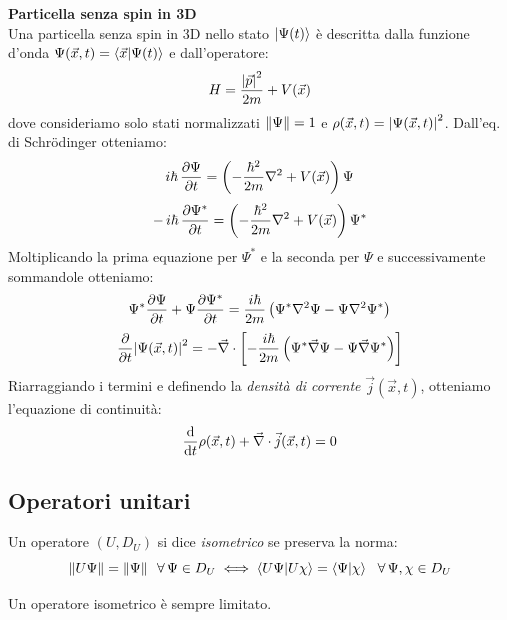 \begin{example}
    \textbf{Particella senza spin in 3D}\\
    Una particella senza spin in 3D nello stato \(\ket{\Psi(t)}\) è descritta dalla funzione d'onda \(\Psi(\vec{x},t)=\braket{\vec{x}}{\Psi(t)}\) e dall'operatore:
    \[
        H= \frac{\abs{\vec{p}}^2}{2m}+ V(\vec{x})
    \]
    dove consideriamo solo stati normalizzati \(\norm{\Psi}= 1\) e \(\rho(\vec{x},t)= \abs{\Psi(\vec{x},t)}^2\).
    Dall'eq. di Schrödinger otteniamo:
    \[
        i\hbar\,\pdv{\Psi}{t}
        = \left( -\frac{\hbar^2}{2m}\nabla^2 + V(\vec{x}) \right)\Psi
    \]
    \[
        -\,i\hbar\,\pdv{\Psi^*}{t}
        = \left( -\frac{\hbar^2}{2m}\nabla^2 + V(\vec{x}) \right)\Psi^*
    \]
    Moltiplicando la prima equazione per \(\Psi^*\) e la seconda per \(\Psi\) e successivamente sommandole otteniamo:
    \[
        \Psi^* \pdv{\Psi}{t} + \Psi \pdv{\Psi^*}{t}
        = \frac{i\hbar}{2m}\left( \Psi^* \nabla^2 \Psi - \Psi \nabla^2 \Psi^* \right)
    \]
    \[
        \pdv{t} \abs{\Psi(\vec{x},t)}^2
        = - \vec{\nabla} \cdot \left[ -\frac{i\hbar}{2m}\left( \Psi^* \vec{\nabla} \Psi - \Psi \vec{\nabla} \Psi^* \right) \right]
    \]
    Riarraggiando i termini e definendo la \textit{densità di corrente} \(\vec{j}(\vec{x},t)\), otteniamo l'equazione di continuità:
    \begin{equation}
        \dv{t}\rho(\vec{x},t) + \vec{\nabla}\cdot  \vec{j}(\vec{x},t)=0
    \end{equation}
\end{example}





\subsection{Operatori unitari}

\begin{definition}
    Un operatore \((U, D_U)\) si dice \textit{isometrico} se preserva la norma:
    \begin{equation}
        \norm{U\Psi}= \norm{\Psi} \ \ \forall\,\Psi \in D_U \iff \braket{U\Psi}{U\chi}= \braket{\Psi}{\chi} \ \ \forall\, \Psi, \chi \in D_U
    \end{equation}
\end{definition}
\begin{remark}
    Un operatore isometrico è sempre limitato.
\end{remark}

